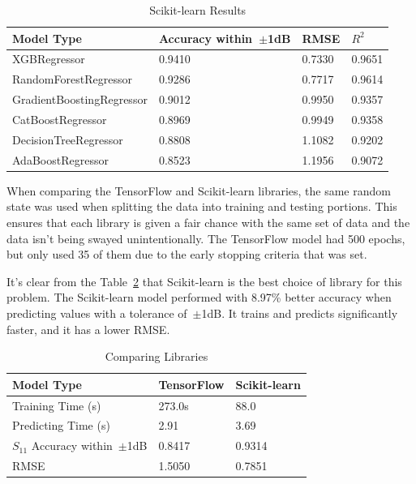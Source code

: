 \documentclass[lettersize,journal]{IEEEtran}
\begin{document}
\begin{table}[h]
\caption{Scikit-learn Results}
\begin{center}
\begin{tabular}{ |l|l|l|l| }
    \hline
    Model Type & Accuracy within~$\pm$1dB & RMSE & $R^2$ \\ 
    \hline
    XGBRegressor & 0.9410 & 0.7330 & 0.9651 \\  
    \hline
    RandomForestRegressor & 0.9286 & 0.7717 & 0.9614 \\
    \hline  
    GradientBoostingRegressor & 0.9012 & 0.9950 & 0.9357 \\
    \hline
    CatBoostRegressor & 0.8969 & 0.9949 & 0.9358 \\    
    \hline
    DecisionTreeRegressor & 0.8808 & 1.1082 & 0.9202 \\  
    \hline
    AdaBoostRegressor & 0.8523 & 1.1956 & 0.9072 \\  
    \hline
\end{tabular}
\end{center}
\label{comparing_sklearn}
\end{table}

When comparing the TensorFlow and Scikit-learn libraries, the same random state was used when splitting the data into training and testing portions. This ensures that each library is given a fair chance with the same set of data and the data isn't being swayed unintentionally. The TensorFlow model had 500 epochs, but only used 35 of them due to the early stopping criteria that was set. 

It's clear from the Table~\ref{comparing_libraries} that Scikit-learn is the best choice of library for this problem. The Scikit-learn model performed with 8.97\% better accuracy when predicting values with a tolerance of~$\pm$1dB. It trains and predicts significantly faster, and it has a lower RMSE.

\begin{table}[h]
\caption{Comparing Libraries}
\begin{center}
\begin{tabular}{ |l|l|l| }
    \hline
    Model Type & TensorFlow & Scikit-learn \\ 
    \hline
    Training Time (s) & 273.0s & 88.0 \\  
    \hline
    Predicting Time (s) & 2.91 & 3.69 \\
    \hline
    $S_{11}$ Accuracy within~$\pm$1dB & 0.8417 & 0.9314 \\
    \hline
    RMSE & 1.5050 & 0.7851 \\
    \hline
\end{tabular}
\end{center}
\label{comparing_libraries}
\end{table}
\end{document}

